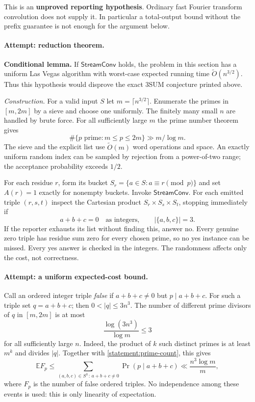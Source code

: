\documentclass[11pt,a4paper]{article}
\newcommand{\E}{\mathbb{E}}
\numberwithin{equation}{section}
\begin{document}
This is an \textbf{unproved reporting hypothesis}. Ordinary fast Fourier
transform convolution does not supply it. In particular a total-output
bound without the prefix guarantee is not enough for the argument below.

\paragraph{Attempt: reduction theorem.}
\textbf{Conditional lemma.} If $\mathsf{StreamConv}$ holds, the problem in
this section has a uniform Las Vegas algorithm with worst-case expected
running time $\widetilde O(n^{3/2})$. Thus this hypothesis would disprove
the exact 3SUM conjecture printed above.

\emph{Construction.} For a valid input $S$ let
$m=\lceil n^{3/2}\rceil$. Enumerate the primes in $[m,2m]$ by a sieve and
choose one uniformly. The finitely many small $n$ are handled by brute
force. For all sufficiently large $m$ the prime number theorem gives
\begin{equation}\label{statement:prime-count}
 \#\{p\text{ prime}:m\le p\le2m\}\gg m/\log m.
\end{equation}
The sieve and the explicit list use $\widetilde O(m)$ word operations and
space. An exactly uniform random index can be sampled by rejection from
a power-of-two range; the acceptance probability exceeds $1/2$.

For each residue $r$, form its bucket
$S_r=\{a\in S:a\equiv r\pmod p\}$ and set
$A(r)=1$ exactly for nonempty buckets. Invoke $\mathsf{StreamConv}$.
For each emitted triple $(r,s,t)$ inspect the Cartesian product
$S_r\times S_s\times S_t$, stopping immediately if
\[
 a+b+c=0\quad\text{as integers},\qquad |\{a,b,c\}|=3.
\]
If the reporter exhausts its list without finding this, answer no.
Every genuine zero triple has residue sum zero for every chosen prime,
so no yes instance can be missed. Every yes answer is checked in the
integers. The randomness affects only the cost, not correctness.

\paragraph{Attempt: a uniform expected-cost bound.}
Call an ordered integer triple \emph{false} if $a+b+c\ne0$ but
$p\mid a+b+c$. For such a triple set $q=a+b+c$; then
$0<|q|\le3n^3$. The number of different prime divisors of $q$ in
$[m,2m]$ is at most
\begin{equation}\label{statement:divisor-count}
 \frac{\log(3n^3)}{\log m}\le3
\end{equation}
for all sufficiently large $n$. Indeed, the product of $k$ such distinct
primes is at least $m^k$ and divides $|q|$. Together with
\eqref{statement:prime-count}, this gives
\begin{equation}\label{statement:false}
 \E F_p
 \le \sum_{(a,b,c)\in S^3\, :\,a+b+c\ne0}
       \Pr(p\mid a+b+c)
 \ll \frac{n^3\log m}{m},
\end{equation}
where $F_p$ is the number of false ordered triples. No independence among
these events is used: this is only linearity of expectation.
\end{document}
